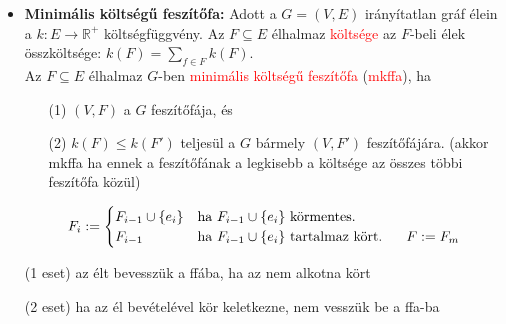 \documentclass[../../szobeli.tex]{subfiles}
\begin{document}
    \begin{center}
        \noindent{}
    \end{center}

    \begin{itemize}
        \item \textbf{Minimális költségű feszítőfa:} Adott a $G = (V,E)$ irányítatlan gráf élein a $k:E \rightarrow \mathbb{R}^+$ költségfüggvény. Az $F \subseteq E$ élhalmaz \textcolor{red}{költsége} az $F$-beli élek összköltsége: $k(F) = \sum_{f\in F}k(F)$. \\ Az $F \subseteq E$ élhalmaz $G$-ben \textcolor{red}{minimális költségű feszítőfa} (\textcolor{red}{mkffa}), ha \begin{itemize}
            \item[(1)] $(V,F)$ a $G$ feszítőfája, és
            \item[(2)] $k(F) \leq k(F')$ teljesül a $G$ bármely $(V,F')$ feszítőfájára. (akkor mkffa ha ennek a feszítőfának a legkisebb a költsége az összes többi feszítőfa közül)
        \end{itemize}
        \begin{equation*}
            F_i :=\begin{cases}
                F_{i-1}\cup \{e_i\} & \text{ha $F_{i-1}\cup \{e_i\}$ körmentes.} \\
                F_{i-1} & \text{ha $F_{i-1}\cup \{e_i\}$ tartalmaz kört. \;\;\; $F:=F_m$}
            \end{cases}
        \end{equation*}

        (1 eset) az élt bevesszük a ffába, ha az nem alkotna kört 
        
        (2 eset) ha az él bevételével kör keletkezne, nem vesszük be a ffa-ba


\end{itemize}
\end{document}
